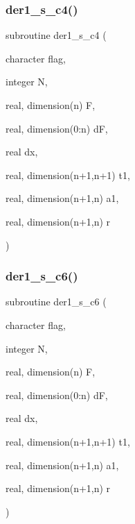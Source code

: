 \mbox{\label{ders__n_8f_ae9bf22bd0ab8ba9d56f086eac5a3af30}} 
\subsubsection{\texorpdfstring{der1\+\_\+s\+\_\+c4()}{der1\_s\_c4()}}
{\footnotesize\ttfamily subroutine der1\+\_\+s\+\_\+c4 (\begin{DoxyParamCaption}\item[{character}]{flag,  }\item[{integer}]{N,  }\item[{real, dimension(n)}]{F,  }\item[{real, dimension(0\+:n)}]{dF,  }\item[{real}]{dx,  }\item[{real, dimension(n+1,n+1)}]{t1,  }\item[{real, dimension(n+1,n)}]{a1,  }\item[{real, dimension(n+1,n)}]{r }\end{DoxyParamCaption})}

\mbox{\label{ders__n_8f_a7ab7acdb9ccb3abe00acc8498c56bc29}} 
\subsubsection{\texorpdfstring{der1\+\_\+s\+\_\+c6()}{der1\_s\_c6()}}
{\footnotesize\ttfamily subroutine der1\+\_\+s\+\_\+c6 (\begin{DoxyParamCaption}\item[{character}]{flag,  }\item[{integer}]{N,  }\item[{real, dimension(n)}]{F,  }\item[{real, dimension(0\+:n)}]{dF,  }\item[{real}]{dx,  }\item[{real, dimension(n+1,n+1)}]{t1,  }\item[{real, dimension(n+1,n)}]{a1,  }\item[{real, dimension(n+1,n)}]{r }\end{DoxyParamCaption})}

